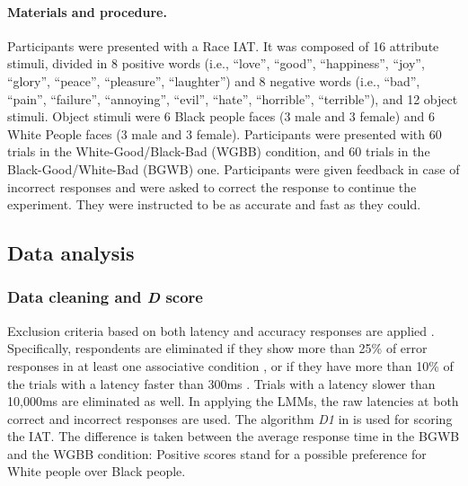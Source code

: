 \documentclass[12pt]{book}
\begin{document}
\paragraph{Materials and procedure.}
Participants were presented with a Race IAT. It was composed of 16 attribute stimuli, divided in 8 positive words (i.e., ``love'',  ``good'', ``happiness'', ``joy'', ``glory'', ``peace'', ``pleasure'', ``laughter'') and 8 negative words (i.e., ``bad'', ``pain'', ``failure'', ``annoying'', ``evil'', ``hate'', ``horrible'', ``terrible''), and 12 object stimuli. Object stimuli \cite<same as in Study 2 of>{nosek2005} were 6 Black people faces (3 male and 3 female) and 6 White People faces (3 male and 3 female). Participants were presented with 60 trials in the White-Good/Black-Bad (WGBB) condition, and 60 trials in the Black-Good/White-Bad (BGWB) one. Participants were given feedback in case of incorrect responses and were asked to correct the response to continue the experiment. They were instructed to be as accurate and fast as they could. 

\subsection{Data analysis}
\subsubsection{Data cleaning and \emph{D} score} \label{sub:cleaning}
Exclusion criteria based on both latency and accuracy responses are applied \cite{Greenwald2003, Nosek2002}. 
Specifically, respondents are eliminated if they show more than 25\% of error responses in at least one associative condition \cite{Nosek2002}, or if they have more than 10\% of the trials with a latency faster than 300ms \cite{Greenwald2003}. 
Trials with a latency slower than 10,000ms are eliminated as well.
In applying the LMMs, the raw latencies at both correct and incorrect responses are used. 
The algorithm \emph{D1} in  is used for scoring the IAT. The difference is taken between the average response time in the BGWB and the WGBB condition: Positive scores stand for a possible preference for White people over Black people. 
\end{document}
